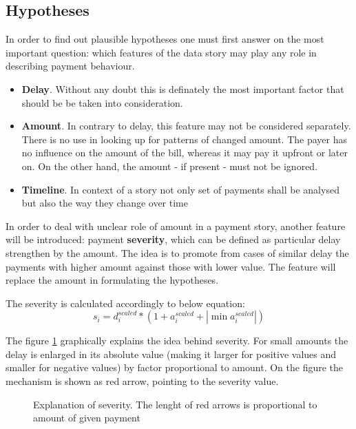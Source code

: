 \documentclass{article}
\begin{document}
\subsection{Hypotheses}
\label{section:hypotheses}

In order to find out plausible hypotheses one must first answer on the most important question: which features of the
data story may play any role in describing payment behaviour.
\begin{itemize}
    \item \textbf{Delay}. Without any doubt this is definately the most important factor that should be be taken into consideration.
    \item \textbf{Amount}. In contrary to delay, this feature may not be considered separately. There is no use in looking up for patterns of changed amount. The payer has no influence on the amount of the bill, whereas it may pay it upfront or later on. On the other hand, the amount - if present - must not be ignored.
    \item \textbf{Timeline}. In context of a story not only set of payments shall be analysed but also the way they change over time
\end{itemize}
In order to deal with unclear role of amount in a payment story, another feature will be introduced: payment \textbf{severity},
which can be defined as particular delay strengthen by the amount.
The idea is to promote from cases of similar delay the payments with higher amount against those with lower value.
The feature will replace the amount in formulating the hypotheses.
\par
The severity is calculated accordingly to below equation:
\[s_i=d_i^{scaled}*(1+a_i^{scaled}+|\min{a_i^{scaled}}|)\]
\par
The figure \ref{fig:301_severity_explained} graphically explains the idea behind severity.
For small amounts the delay is enlarged in its absolute value (making it larger for positive values and smaller for negative values) by factor proportional to amount.
On the figure the mechanism is shown as red arrow, pointing to the severity value.

\begin{figure}[htbp!]
    \begin{center}
        
    \caption{Explanation of severity. The lenght of red arrows is proportional to amount of given payment}
    \label{fig:301_severity_explained}
    \end{center}
\end{figure}
\end{document}
